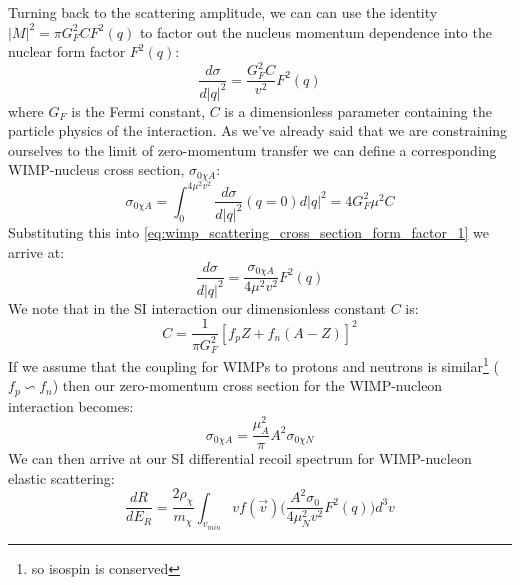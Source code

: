 \par
Turning back to the scattering amplitude, we can can use the identity $|M|^2=\pi G^2_F C F^2(q)$ to factor out the nucleus momentum dependence into the nuclear form factor $F^2(q)$:
\begin{equation}
    \frac{d\sigma}{d|q|^2} = \frac{G^2_F C}{v^2} F^2(q)
    \label{eq:wimp_scattering_cross_section_form_factor_1}
\end{equation}
where $G_F$ is the Fermi constant, $C$ is a dimensionless parameter containing the particle physics of the interaction.
As we've already said that we are constraining ourselves to the limit of zero-momentum transfer we can define a corresponding WIMP-nucleus cross section, $\sigma_{0 \chi A}$:
\begin{equation}
    \sigma_{0 \chi A} = \int^{4\mu^2 v^2}_{0} \frac{d\sigma}{d|q|^2}(q=0) d|q|^2 = 4G^2_F \mu^2 C
\end{equation}
Substituting this into \autoref{eq:wimp_scattering_cross_section_form_factor_1} we arrive at:
\begin{equation}
    \frac{d\sigma}{d|q|^2} = \frac{\sigma_{0 \chi A}}{4 \mu^2 v^2} F^2(q)
    \label{eq:wimp_scattering_cross_section_form_factor_2}
\end{equation}
We note that in the SI interaction our dimensionless constant $C$ is:
\begin{equation}
    C = \frac{1}{\pi G^2_F} [f_pZ + f_n (A-Z)]^2
\end{equation}
If we assume that the coupling for WIMPs to protons and neutrons is similar\footnote{so isospin is conserved} ($f_p \backsim f_n$) then our zero-momentum cross section for the WIMP-nucleon interaction becomes:
\begin{equation}
    \sigma_{0 \chi A} = \frac{\mu^2_A}{\pi} A^2 \sigma_{0 \chi N}
\end{equation}
We can then arrive at our SI differential recoil spectrum for WIMP-nucleon elastic scattering:
\begin{equation}
    \frac{dR}{dE_R} = \frac{2 \rho_\chi}{m_\chi} \int_{v_{min}} v f(\vec{v}) \bigg(\frac{A^2 \sigma_0}{4 \mu^2_N v^2} F^2(q) \bigg) d^3v
    \label{eq:wimp_si_differential_rate}
\end{equation}

 
